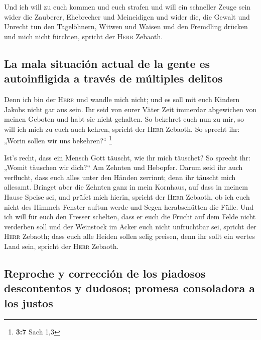  Und ich will zu euch kommen und euch strafen und will ein
schneller Zeuge sein wider die Zauberer, Ehebrecher und Meineidigen und
wider die, die Gewalt und Unrecht tun den Tagelöhnern, Witwen und Waisen
und den Fremdling drücken und mich nicht fürchten, spricht der
\textsc{Herr} Zebaoth.

\hypertarget{la-mala-situaciuxf3n-actual-de-la-gente-es-autoinfligida-a-travuxe9s-de-muxfaltiples-delitos}{%
\subsection{La mala situación actual de la gente es autoinfligida a
través de múltiples
delitos}\label{la-mala-situaciuxf3n-actual-de-la-gente-es-autoinfligida-a-travuxe9s-de-muxfaltiples-delitos}}

 Denn ich bin der \textsc{Herr} und wandle mich nicht; und
es soll mit euch Kindern Jakobs nicht gar aus sein.  Ihr
seid von eurer Väter Zeit immerdar abgewichen von meinen Geboten und
habt sie nicht gehalten. So bekehret euch nun zu mir, so will ich mich
zu euch auch kehren, spricht der \textsc{Herr} Zebaoth. So sprecht ihr:
„Worin sollen wir uns bekehren?{}`` \footnote{\textbf{3:7} Sach 1,3}

 Ist's recht, dass ein Mensch Gott täuscht, wie ihr mich
täuschet? So sprecht ihr: „Womit täuschen wir dich?{}`` Am Zehnten und
Hebopfer.  Darum seid ihr auch verflucht, dass euch alles
unter den Händen zerrinnt; denn ihr täuscht mich allesamt.
 Bringet aber die Zehnten ganz in mein Kornhaus, auf dass
in meinem Hause Speise sei, und prüfet mich hierin, spricht der
\textsc{Herr} Zebaoth, ob ich euch nicht des Himmels Fenster auftun
werde und Segen herabschütten die Fülle.  Und ich will
für euch den Fresser schelten, dass er euch die Frucht auf dem Felde
nicht verderben soll und der Weinstock im Acker euch nicht unfruchtbar
sei, spricht der \textsc{Herr} Zebaoth;  dass euch alle
Heiden sollen selig preisen, denn ihr sollt ein wertes Land sein,
spricht der \textsc{Herr} Zebaoth.

\hypertarget{reproche-y-correcciuxf3n-de-los-piadosos-descontentos-y-dudosos-promesa-consoladora-a-los-justos}{%
\subsection{Reproche y corrección de los piadosos descontentos y
dudosos; promesa consoladora a los
justos}\label{reproche-y-correcciuxf3n-de-los-piadosos-descontentos-y-dudosos-promesa-consoladora-a-los-justos}}

